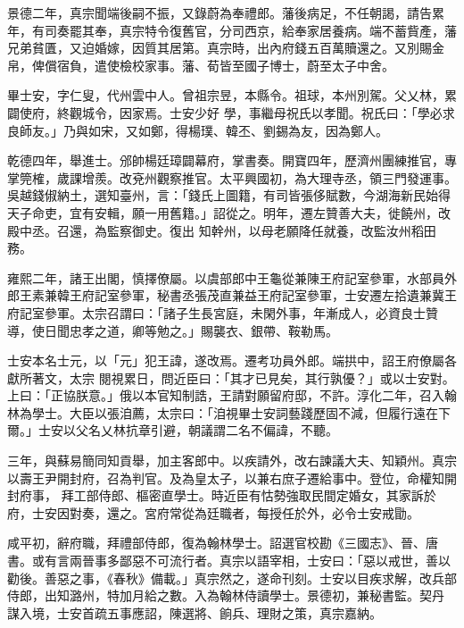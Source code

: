 \begin{pinyinscope}
 景德二年，真宗聞端後嗣不振，又錄蔚為奉禮郎。藩後病足，不任朝謁，請告累年，有司奏罷其奉，真宗特令復舊官，分司西京，給奉家居養病。端不蓄貲產，藩兄弟貧匱，又迫婚嫁，因質其居第。真宗時，出內府錢五百萬贖還之。又別賜金帛，俾償宿負，遣使檢校家事。藩、荀皆至國子博士，蔚至太子中舍。



 畢士安，字仁叟，代州雲中人。曾祖宗昱，本縣令。祖球，本州別駕。父乂林，累闢使府，終觀城令，因家焉。士安少好
 學，事繼母祝氏以孝聞。祝氏曰：「學必求良師友。」乃與如宋，又如鄭，得楊璞、韓丕、劉錫為友，因為鄭人。



 乾德四年，舉進士。邠帥楊廷璋闢幕府，掌書奏。開寶四年，歷濟州團練推官，專掌筦榷，歲課增羨。改兗州觀察推官。太平興國初，為大理寺丞，領三門發運事。吳越錢俶納土，選知臺州，言：「錢氏上圖籍，有司皆張侈賦數，今湖海新民始得天子命吏，宜有安輯，願一用舊籍。」詔從之。明年，遷左贊善大夫，徙饒州，改殿中丞。召還，為監察御史。復出
 知幹州，以母老願降任就養，改監汝州稻田務。



 雍熙二年，諸王出閣，慎擇僚屬。以虞部郎中王龜從兼陳王府記室參軍，水部員外郎王素兼韓王府記室參軍，秘書丞張茂直兼益王府記室參軍，士安遷左拾遺兼冀王府記室參軍。太宗召謂曰：「諸子生長宮庭，未閑外事，年漸成人，必資良士贊導，使日聞忠孝之道，卿等勉之。」賜襲衣、銀帶、鞍勒馬。



 士安本名士元，以「元」犯王諱，遂改焉。遷考功員外郎。端拱中，詔王府僚屬各獻所著文，太宗
 閱視累日，問近臣曰：「其才已見矣，其行孰優？」或以士安對。上曰：「正協朕意。」俄以本官知制誥，王請對願留府邸，不許。淳化二年，召入翰林為學士。大臣以張洎薦，太宗曰：「洎視畢士安詞藝踐歷固不減，但履行遠在下爾。」士安以父名乂林抗章引避，朝議謂二名不偏諱，不聽。



 三年，與蘇易簡同知貢舉，加主客郎中。以疾請外，改右諫議大夫、知穎州。真宗以壽王尹開封府，召為判官。及為皇太子，以兼右庶子遷給事中。登位，命權知開封府事，
 拜工部侍郎、樞密直學士。時近臣有怙勢強取民間定婚女，其家訴於府，士安因對奏，還之。宮府常從為廷職者，每授任於外，必令士安戒勖。



 咸平初，辭府職，拜禮部侍郎，復為翰林學士。詔選官校勘《三國志》、晉、唐書。或有言兩晉事多鄙惡不可流行者。真宗以語宰相，士安曰：「惡以戒世，善以勸後。善惡之事，《春秋》備載。」真宗然之，遂命刊刻。士安以目疾求解，改兵部侍郎，出知潞州，特加月給之數。入為翰林侍讀學士。景德初，兼秘書監。契丹
 謀入境，士安首疏五事應詔，陳選將、餉兵、理財之策，真宗嘉納。




\end{pinyinscope}
